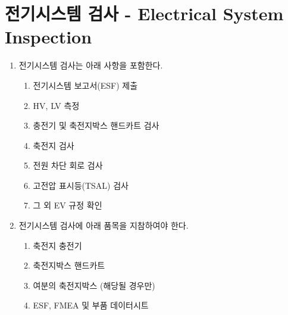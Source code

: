 \documentclass[final,a4paper,10pt]{report}
\begin{document}
\section{전기시스템 검사 - Electrical System Inspection}\label{rule:formula-technical.electrical-system-inspection}
\begin{enumerate}
  \item\label{rule:formula-technical.electrical-system-inspection.checklist} 전기시스템 검사는 아래 사항을 포함한다.
    \begin{enumerate}
      \item\label{rule:formula-technical.electrical-system-inspection.checklist.esf-submission} 전기시스템 보고서(ESF) 제출
      \item\label{rule:formula-technical.electrical-system-inspection.checklist.hv-lv-measurement} HV, LV 측정
      \item\label{rule:formula-technical.electrical-system-inspection.checklist.charger-accumulator-cart} 충전기 및 축전지박스 핸드카트 검사
      \item\label{rule:formula-technical.electrical-system-inspection.checklist.accumulator-inspection} 축전지 검사
      \item\label{rule:formula-technical.electrical-system-inspection.checklist.shutdown-circuit-inspection} 전원 차단 회로 검사
      \item\label{rule:formula-technical.electrical-system-inspection.checklist.tsal-inspection} 고전압 표시등(TSAL) 검사
      \item\label{rule:formula-technical.electrical-system-inspection.checklist.other-ev-compliance} 그 외 EV 규정 확인
    \end{enumerate}
  \item\label{rule:formula-technical.electrical-system-inspection.required-equipment} 전기시스템 검사에 아래 품목을 지참하여야 한다.
    \begin{enumerate}
      \item\label{rule:formula-technical.electrical-system-inspection.required-equipment.accumulator-charger} 축전지 충전기
      \item\label{rule:formula-technical.electrical-system-inspection.required-equipment.accumulator-handcart} 축전지박스 핸드카트
      \item\label{rule:formula-technical.electrical-system-inspection.required-equipment.spare-accumulator-box} 여분의 축전지박스 (해당될 경우만)
      \item\label{rule:formula-technical.electrical-system-inspection.required-equipment.esf-fmea-datasheets} ESF, FMEA 및 부품 데이터시트

\end{enumerate}
\end{enumerate}
\end{document}
